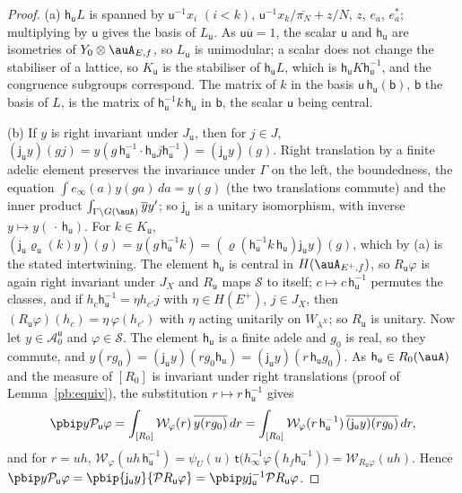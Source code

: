 \documentclass[10pt]{amsart}
\theoremstyle{definition}
\theoremstyle{remark}
\providecommand{\auAz}{\mathcal A_0}
\providecommand{\auP}{\mathcal P}
\providecommand{\auS}{\mathcal S}
\providecommand{\aubar}[1]{\overline{#1}}
\begin{document}
\begin{proof}
(a) $\mathsf h_{\mathsf u}L$ is spanned by $\mathsf u^{-1}x_i$ $(i<k)$, $\mathsf u^{-1}x_k/\aubar{\pi_N}+
z/N$, $z$, $e_a$, $e_a^*$; multiplying by $\mathsf u$ gives the basis of $L_{\mathsf u}$. As
$\mathsf u\aubar{\mathsf u}=1$, the scalar $\mathsf u$ and $\mathsf h_{\mathsf u}$ are isometries of
$Y_0\otimes\auA_{E,f}$, so $L_{\mathsf u}$ is unimodular; a scalar does not change the stabiliser of a
lattice, so $K_{\mathsf u}$ is the stabiliser of $\mathsf h_{\mathsf u}L$, which is $\mathsf h_{\mathsf u}
K\mathsf h_{\mathsf u}^{-1}$, and the congruence subgroups correspond. The matrix of $k$ in the basis
$\mathsf u\,\mathsf h_{\mathsf u}(\mathsf b)$, $\mathsf b$ the basis of $L$, is the matrix of $\mathsf
h_{\mathsf u}^{-1}k\,\mathsf h_{\mathsf u}$ in $\mathsf b$, the scalar $\mathsf u$ being central.

(b) If $y$ is right invariant under $J_{\mathsf u}$, then for $j\in J$, $(\mathsf j_{\mathsf u}y)(gj)=
y(g\,\mathsf h_{\mathsf u}^{-1}\cdot\mathsf h_{\mathsf u}j\mathsf h_{\mathsf u}^{-1})=(\mathsf j_{\mathsf u}y)
(g)$. Right translation by a finite adelic element preserves the invariance under $\Gamma$ on the
left, the boundedness, the equation $\int e_\infty(a)y(ga)\,da=y(g)$ (the two translations commute)
and the inner product $\int_{\Gamma\backslash G(\auA)}\aubar yy'$; so $\mathsf j_{\mathsf u}$ is a
unitary isomorphism, with inverse $y\mapsto y(\,\cdot\,\mathsf h_{\mathsf u})$. For $k\in K_{\mathsf u}$,
$(\mathsf j_{\mathsf u}\varrho_{\mathsf u}(k)y)(g)=y(g\,\mathsf h_{\mathsf u}^{-1}k)=(\varrho(\mathsf h_{\mathsf
u}^{-1}k\,\mathsf h_{\mathsf u})\mathsf j_{\mathsf u}y)(g)$, which by (a) is the stated intertwining.
The element $\mathsf h_{\mathsf u}$ is central in $H(\auA_{E^+,f})$, so $R_{\mathsf u}\varphi$ is again
right invariant under $J_X$ and $R_{\mathsf u}$ maps $\auS$ to itself; $c\mapsto c\,\mathsf h_{\mathsf
u}^{-1}$ permutes the classes, and if $h_c\mathsf h_{\mathsf u}^{-1}=\eta h_{c'}j$ with $\eta\in H(E^+)$,
$j\in J_X$, then $(R_{\mathsf u}\varphi)(h_c)=\eta\,\varphi(h_{c'})$ with $\eta$ acting unitarily on
$W_{\lambda^X}$; so $R_{\mathsf u}$ is unitary. Now let $y\in\auAz^{\mathsf u}$ and $\varphi\in\auS$. The
element $\mathsf h_{\mathsf u}$ is a finite adele and $g_0$ is real, so they commute, and
$y(rg_0)=(\mathsf j_{\mathsf u}y)(rg_0\mathsf h_{\mathsf u})=(\mathsf j_{\mathsf u}y)(r\,\mathsf h_{\mathsf u}g_0)$.
As $\mathsf h_{\mathsf u}\in R_0(\auA)$ and the measure of $[R_0]$ is invariant under right translations
(proof of Lemma~\ref{pb:equiv}), the substitution $r\mapsto r\,\mathsf h_{\mathsf u}^{-1}$ gives
\[
\pbip y{\auP_{\mathsf u}\varphi}=\int_{[R_0]}\mathcal W_\varphi(r)\,\aubar{y(rg_0)}\,dr=\int_{[R_0]}
\mathcal W_\varphi(r\,\mathsf h_{\mathsf u}^{-1})\,\aubar{(\mathsf j_{\mathsf u}y)(rg_0)}\,dr ,
\]
and for $r=uh$, $\mathcal W_\varphi(uh\,\mathsf h_{\mathsf u}^{-1})=\psi_U(u)\,\mathsf t\bigl(h_\infty^{-1}
\varphi(h_f\mathsf h_{\mathsf u}^{-1})\bigr)=\mathcal W_{R_{\mathsf u}\varphi}(uh)$. Hence $\pbip y{\auP_{\mathsf
u}\varphi}=\pbip{\mathsf j_{\mathsf u}y}{\auP R_{\mathsf u}\varphi}=\pbip y{\mathsf j_{\mathsf u}^{-1}\auP
R_{\mathsf u}\varphi}$.


\end{proof}
\end{document}

